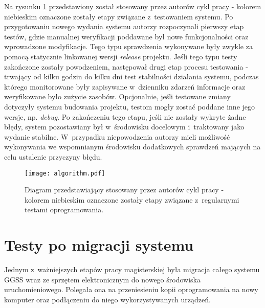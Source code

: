 \clearpage
Na rysunku \ref{fig:tests_1} przedstawiony został stosowany przez autorów cykl pracy - kolorem niebieskim oznaczone zostały etapy związane z~testowaniem systemu. Po przygotowaniu nowego wydania systemu autorzy rozpoczynali pierwszy etap testów, gdzie manualnej weryfikacji poddawane był nowe funkcjonalności oraz wprowadzone modyfikacje. Tego typu sprawdzenia wykonywane były zwykle za pomocą statycznie linkowanej wersji \emph{release} projektu. Jeśli tego typu testy zakończone zostały powodzeniem, następował drugi etap procesu testowania - trwający od kilku godzin do kilku dni test stabilności działania systemu, podczas którego monitorowane były zapisywane w~dzienniku zdarzeń informacje oraz weryfikowane było zużycie zasobów. Opcjonalnie, jeśli testowane zmiany dotyczyły systemu budowania projektu, testom mogły zostać poddane inne jego wersje, np. \emph{debug}. Po zakończeniu tego etapu, jeśli nie zostały wykryte żadne błędy, system pozostawiany był w~środowisku docelowym i~traktowany jako wydanie stabilne. W~przypadku niepowodzenia autorzy mieli możliwość wykonywania we wspomnianym środowisku dodatkowych sprawdzeń mających na celu ustalenie przyczyny błędu.

\begin{figure}[H]
\centering
\texttt{[image: algorithm.pdf]}
\caption{Diagram przedstawiający stosowany przez autorów cykl pracy - kolorem niebieskim oznaczone zostały etapy związane z~regularnymi testami oprogramowania.}
\label{fig:tests_1}
\end{figure}

\section{Testy po migracji systemu}

Jednym z~ważniejszych etapów pracy magisterskiej była migracja całego systemu GGSS wraz ze sprzętem elektronicznym do nowego środowiska uruchomieniowego. Polegała ona na przeniesieniu kopii oprogramowania na nowy komputer oraz podłączeniu do niego wykorzystywanych urządzeń.

